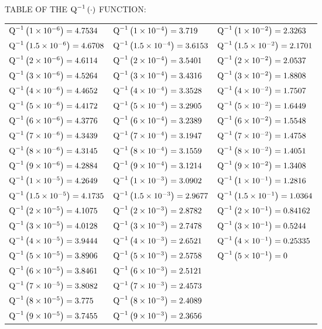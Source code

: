 \newpage
\centerline{ TABLE OF THE $\Qinv{\cdot}$ FUNCTION: }
\begin{tabular}{|l|l|l|}
  \hline
$\Qinv{1\times 10^{-6}} =  4.7534$ & $\Qinv{1\times 10^{-4}} =  3.719$ & $\Qinv{1\times 10^{-2}} =  2.3263$ \\
$\Qinv{1.5\times 10^{-6}} =  4.6708$ & $\Qinv{1.5\times 10^{-4}} =  3.6153$ & $\Qinv{1.5\times 10^{-2}} =  2.1701$ \\
$\Qinv{2\times 10^{-6}} =  4.6114$ & $\Qinv{2\times 10^{-4}} =  3.5401$ & $\Qinv{2\times 10^{-2}} =  2.0537$ \\
$\Qinv{3\times 10^{-6}} =  4.5264$ & $\Qinv{3\times 10^{-4}} =  3.4316$ & $\Qinv{3\times 10^{-2}} =  1.8808$ \\
$\Qinv{4\times 10^{-6}} =  4.4652$ & $\Qinv{4\times 10^{-4}} =  3.3528$ & $\Qinv{4\times 10^{-2}} =  1.7507$ \\
$\Qinv{5\times 10^{-6}} =  4.4172$ & $\Qinv{5\times 10^{-4}} =  3.2905$ & $\Qinv{5\times 10^{-2}} =  1.6449$ \\
$\Qinv{6\times 10^{-6}} =  4.3776$ & $\Qinv{6\times 10^{-4}} =  3.2389$ & $\Qinv{6\times 10^{-2}} =  1.5548$ \\
$\Qinv{7\times 10^{-6}} =  4.3439$ & $\Qinv{7\times 10^{-4}} =  3.1947$ & $\Qinv{7\times 10^{-2}} =  1.4758$ \\
$\Qinv{8\times 10^{-6}} =  4.3145$ & $\Qinv{8\times 10^{-4}} =  3.1559$ & $\Qinv{8\times 10^{-2}} =  1.4051$ \\
$\Qinv{9\times 10^{-6}} =  4.2884$ & $\Qinv{9\times 10^{-4}} =  3.1214$ & $\Qinv{9\times 10^{-2}} =  1.3408$ \\
\hline
$\Qinv{1\times 10^{-5}} =  4.2649$ & $\Qinv{1\times 10^{-3}} =  3.0902$ & $\Qinv{1\times 10^{-1}} =  1.2816$ \\
$\Qinv{1.5\times 10^{-5}} =  4.1735$ & $\Qinv{1.5\times 10^{-3}} =  2.9677$ & $\Qinv{1.5\times 10^{-1}} =  1.0364$ \\
$\Qinv{2\times 10^{-5}} =  4.1075$ & $\Qinv{2\times 10^{-3}} =  2.8782$ & $\Qinv{2\times 10^{-1}} =  0.84162$ \\
$\Qinv{3\times 10^{-5}} =  4.0128$ & $\Qinv{3\times 10^{-3}} =  2.7478$ & $\Qinv{3\times 10^{-1}} =  0.5244$ \\
$\Qinv{4\times 10^{-5}} =  3.9444$ & $\Qinv{4\times 10^{-3}} =  2.6521$ & $\Qinv{4\times 10^{-1}} =  0.25335$ \\
$\Qinv{5\times 10^{-5}} =  3.8906$ & $\Qinv{5\times 10^{-3}} =  2.5758$ & $\Qinv{5\times 10^{-1}} =  0$ \\
$\Qinv{6\times 10^{-5}} =  3.8461$ & $\Qinv{6\times 10^{-3}} =  2.5121$ &  \\
$\Qinv{7\times 10^{-5}} =  3.8082$ & $\Qinv{7\times 10^{-3}} =  2.4573$ &  \\
$\Qinv{8\times 10^{-5}} =  3.775$ & $\Qinv{8\times 10^{-3}} =  2.4089$ &  \\
$\Qinv{9\times 10^{-5}} =  3.7455$ & $\Qinv{9\times 10^{-3}} =  2.3656$ &  \\
\hline
\end{tabular}


